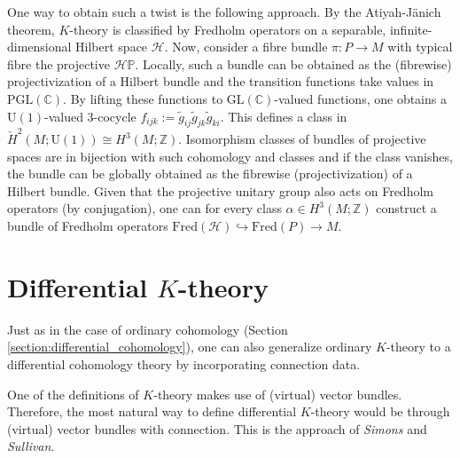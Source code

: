 {    One way to obtain such a twist is the following approach. By the Atiyah-J\"anich theorem, $K$-theory is classified by Fredholm operators on a separable, infinite-dimensional Hilbert space $\mathcal{H}$. Now, consider a fibre bundle $\pi:P\rightarrow M$ with typical fibre the projective $\mathcal{H}\mathbb{P}$. Locally, such a bundle can be obtained as the (fibrewise) projectivization of a Hilbert bundle and the transition functions take values in $\mathrm{PGL}(\mathbb{C})$. By lifting these functions to $\mathrm{GL}(\mathbb{C})$-valued functions, one obtains a $\mathrm{U}(1)$-valued 3-cocycle $f_{ijk}:=\widetilde{g}_{ij}\widetilde{g}_{jk}\widetilde{g}_{ki}$. This defines a class in $\check{H}^2(M;\mathrm{U}(1))\cong H^3(M;\mathbb{Z})$. Isomorphism classes of bundles of projective spaces are in bijection with such cohomology and classes and if the class vanishes, the bundle can be globally obtained as the fibrewise (projectivization) of a Hilbert bundle. Given that the projective unitary group also acts on Fredholm operators (by conjugation), one can for every class $\alpha\in H^3(M;\mathbb{Z})$ construct a bundle of Fredholm operators $\mathrm{Fred}(\mathcal{H})\hookrightarrow\mathrm{Fred}(P)\rightarrow M$.


\section{\texorpdfstring{Differential $K$-theory}{Differential K-theory}}

    Just as in the case of ordinary cohomology (Section \ref{section:differential_cohomology}), one can also generalize ordinary $K$-theory to a differential cohomology theory by incorporating connection data.

    One of the definitions of $K$-theory makes use of (virtual) vector bundles. Therefore, the most natural way to define differential $K$-theory would be through (virtual) vector bundles with connection. This is the approach of \textit{Simons} and \textit{Sullivan}.

}
